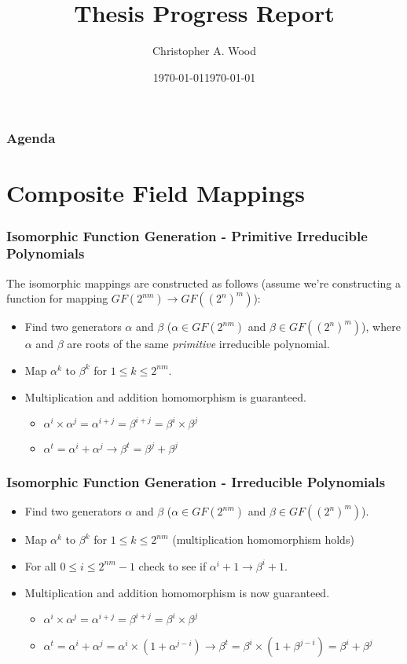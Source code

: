\documentclass[handout]{beamer}
\title[Composite Field Decomposition for Higher Order S-boxes]{Thesis Progress Report}
\institute[RIT]{}
\date{\today}
\author{Christopher A. Wood}
\date{\today}
\begin{document}

\begin{frame}
	\titlepage
\end{frame}

\begin{frame}
	\frametitle{Agenda}
	\tableofcontents
\end{frame}

\section{Composite Field Mappings}
\begin{frame}
	\frametitle{Isomorphic Function Generation - Primitive Irreducible Polynomials}
	The isomorphic mappings are constructed as follows (assume we're constructing a function for mapping $GF(2^{nm}) \to GF((2^n)^m)$):
	\begin{itemize}
		\item Find two generators $\alpha$ and $\beta$ ($\alpha \in GF(2^{nm})$ and $\beta \in GF((2^n)^m)$), where $\alpha$ and $\beta$ are roots of the same \emph{primitive} irreducible polynomial.
		\item Map $\alpha^k$ to $\beta^k$ for $1 \leq k \leq 2^{nm}$.
		\item Multiplication and addition homomorphism is guaranteed. 
		\begin{itemize}
			\item $\alpha^i \times \alpha^j = \alpha^{i + j} = \beta^{i + j} = \beta^i \times \beta^j$
			\item $\alpha^t = \alpha^i + \alpha^j \to \beta^t = \beta^j + \beta^j$
		\end{itemize}
	\end{itemize}
\end{frame}

\begin{frame}
	\frametitle{Isomorphic Function Generation - Irreducible Polynomials}
	\begin{itemize}
		\item Find two generators $\alpha$ and $\beta$ ($\alpha \in GF(2^{nm})$ and $\beta \in GF((2^n)^m)$).
		\item Map $\alpha^k$ to $\beta^k$ for $1 \leq k \leq 2^{nm}$ (multiplication homomorphism holds)
		\item For all $0 \leq i \leq 2^{nm} - 1$ check to see if $\alpha^i + 1 \to \beta^i + 1$.
		\item Multiplication and addition homomorphism is now guaranteed.
		\begin{itemize}
			\item $\alpha^i \times \alpha^j = \alpha^{i + j} = \beta^{i + j} = \beta^i \times \beta^j$
			\item $\alpha^t = \alpha^i + \alpha^j = \alpha^i \times (1 + \alpha^{j - i}) \to \beta^t = \beta^i \times (1 + \beta^{j - i}) = \beta^i + \beta^j$
		\end{itemize}
	\end{itemize}
\end{frame}
\end{document}
